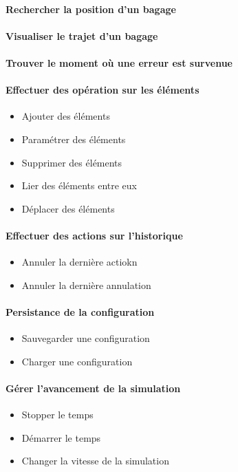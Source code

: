 {
	\paragraph{ Rechercher la position d'un bagage}
	\paragraph{ Visualiser le trajet d'un bagage}
	\paragraph{ Trouver le moment où une erreur est survenue}
}
{
\paragraph{Effectuer des opération sur les éléments }
\begin{itemize}
	\item Ajouter des éléments
	\item Paramétrer des éléments
	\item Supprimer des éléments
	\item Lier des éléments entre eux
	\item Déplacer des éléments
\end{itemize}

\paragraph{Effectuer des actions sur l'historique}
\begin{itemize}
	\item Annuler la dernière actiokn
	\item Annuler la dernière annulation
\end{itemize}

\paragraph{Persistance de la configuration}
\begin{itemize}
	\item Sauvegarder une configuration
	\item Charger une configuration
\end{itemize}

\paragraph{Gérer l'avancement de la simulation}
\begin{itemize}
	\item Stopper le temps
	\item Démarrer le temps
	\item Changer la vitesse de la simulation
\end{itemize}

}
